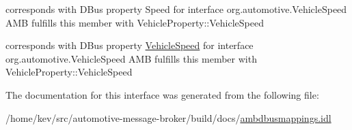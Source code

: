 corresponds with D\+Bus property Speed for interface org.\+automotive.\+Vehicle\+Speed A\+M\+B fulfills this member with Vehicle\+Property\+::\+Vehicle\+Speed 

corresponds with D\+Bus property \hyperlink{interfaceVehicleSpeed}{Vehicle\+Speed} for interface org.\+automotive.\+Vehicle\+Speed A\+M\+B fulfills this member with Vehicle\+Property\+::\+Vehicle\+Speed 

The documentation for this interface was generated from the following file\+:\begin{DoxyCompactItemize}
\item 
/home/kev/src/automotive-\/message-\/broker/build/docs/\hyperlink{ambdbusmappings_8idl}{ambdbusmappings.\+idl}\end{DoxyCompactItemize}
